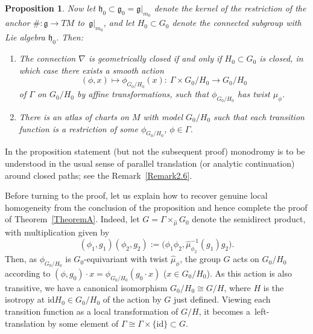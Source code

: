 \documentclass[pdftex]{sigma}
\newcommand\identity{\mathrm{id}}
\numberwithin{equation}{section}
\newtheorem{PropositionBlaom}[TheoremBlaom]{Proposition}
 { \theoremstyle{definition}
\newtheorem{CounterexampleBlaom}[TheoremBlaom]{Counterexample}
\newtheorem{RemarkBlaom}[TheoremBlaom]{Remark} }
\begin{document}
\begin{PropositionBlaom}
  Now let ${\mathfrak h}_0 \subset {\mathfrak g}_0={\mathfrak g}|_{m_0}$
  denote the kernel of the restriction of the anchor $\# \colon
  \mathfrak g \rightarrow TM$ to~$\mathfrak g|_{m_0}$, and let $H_0
  \subset G_0$ denote the connected subgroup with Lie algebra
  ${\mathfrak h}_0$. Then:
  \begin{enumerate}\itemsep=0pt
  \item[$(3)$] %
  The connection $\nabla $ is geometrically closed if
    and only if $H_0 \subset G_0$ is closed, in which case there
    exists a smooth action
    \[
    (\phi,x)\mapsto \phi_{G_0/H_0}(x) \colon \
    \Gamma \times {G_0/H_0} \rightarrow {G_0/H_0}
    \] of $\Gamma $ on
    ${G_0/H_0} $ by affine transformations, such that $\phi_{G_0/H_0}
    $ has twist $\hat \mu_\phi$.
  \item[$(4)$]%
   There is an atlas of charts on $M$ with model ${G_0/H_0}$ such
    that each transition function is a restriction of some
    $\phi_{G_0/H_0}$, $\phi \in \Gamma$.
  \end{enumerate}
\end{PropositionBlaom}

\begin{RemarkBlaom}\label{Remark5.2}
  In the proposition statement (but not the subsequent proof)
  monodromy is to be understood in the usual sense of parallel
  translation (or analytic continuation) around closed paths; see the
  Remark~\ref{Remark2.6}.
\end{RemarkBlaom}

Before turning to the proof, let us explain how to recover genuine
local homogeneity from the conclusion of the proposition and hence
complete the proof of Theorem~\ref{TheoremA}. Indeed, let $G=\Gamma
\times_{\hat\mu} G_0$ denote the semidirect product, with
multiplication given by \begin{equation*}
  (\phi_1,g_1)(\phi_2,g_2):=\big( \phi_1
  \phi_2,\hat{\mu}_{\phi_2}^{-1}(g_1)g_2 \big).
\end{equation*}
Then, as $\phi_{G_0/H_0} $ is $G_0$-equivariant with twist $\hat
\mu_\phi$, the group $G$ acts on ${G_0/H_0}$ according to
$(\phi,g_0)\cdot x = \phi_{G_0/H_0}(g_0 \cdot x)$ ($x \in
G_0/H_0$). As this action is also transitive, we have a canonical
isomorphism ${G_0/H_0} \cong G/H$, where $H$ is the isotropy at $\mathrm{id} H_0
\in {G_0/H_0} $ of the action by $G$ just def\/ined. Viewing each
transition function as a local transformation of $G/H$, it becomes a~left-translation by some element of $\Gamma \cong \Gamma \times
\{\identity\}\subset G$.
\end{document}
